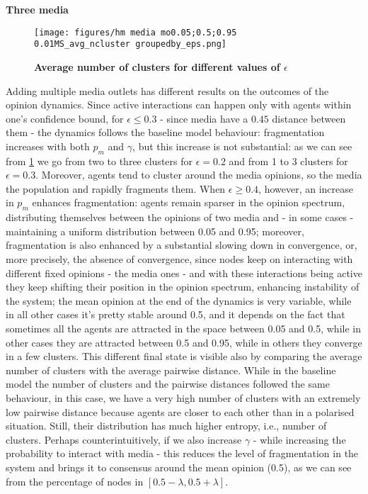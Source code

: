 \documentclass[10pt,letterpaper]{article}
\begin{document}
\textbf{Three media}
\begin{figure}
    \centering
    \texttt{[image: figures/hm media mo0.05;0.5;0.95 0.01MS\_avg\_ncluster groupedby\_eps.png]}
    \caption{\textbf{Average number of clusters for different values of $\epsilon$}}
    \label{fig:3mncluster}
\end{figure}
Adding multiple media outlets has different results on the outcomes of the opinion dynamics. Since active interactions can happen only with agents within one's confidence bound, for $\epsilon \leq 0.3$ - since media have a $0.45$ distance between them - the dynamics follows the baseline model behaviour: fragmentation increases with both $p_m$ and $\gamma$, but this increase is not substantial: as we can see from \ref{fig:3mncluster} we go from two to three clusters for $\epsilon=0.2$ and from 1 to 3 clusters for $\epsilon=0.3$. Moreover, 
agents tend to cluster around the media opinions, so the media  the population and rapidly fragments them. When $\epsilon \geq 0.4$, however, an increase in $p_m$ enhances fragmentation: agents remain sparser in the opinion spectrum, distributing themselves between the opinions of two media and - in some cases - maintaining a uniform distribution between 0.05 and 0.95; moreover, fragmentation is also enhanced by a substantial slowing down in convergence, or, more precisely, the absence of convergence, since nodes keep on interacting with different fixed opinions - the media ones - and with these interactions being active they keep shifting their position in the opinion spectrum, enhancing instability of the system; the mean opinion at the end of the dynamics is very variable, while in all other cases it's pretty stable around 0.5, and it depends on the fact that sometimes all the agents are attracted in the space between 0.05 and 0.5, while in other cases they are attracted between 0.5 and 0.95, while in others they converge in a few clusters. This different final state is visible also by comparing the average number of clusters with the average pairwise distance. While in the baseline model the number of clusters and the pairwise distances followed the same behaviour, in this case, we have a very high number of clusters with an extremely low pairwise distance because agents are closer to each other than in a polarised situation. Still, their distribution has much higher entropy, i.e., number of clusters. Perhaps counterintuitively, if we also increase $\gamma$ - while increasing the probability to interact with media - this reduces the level of fragmentation in the system and brings it to consensus around the mean opinion (0.5), as we can see from the percentage of nodes in $[0.5-\lambda, 0.5+\lambda]$.
\end{document}
